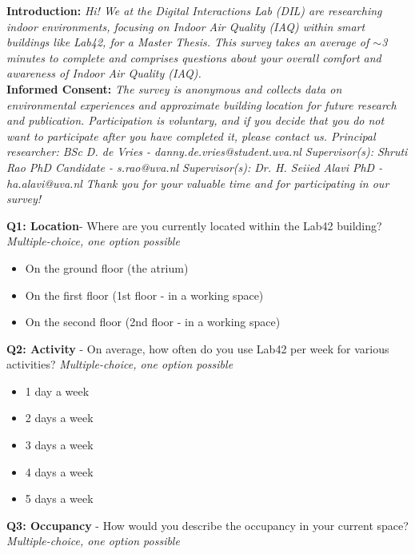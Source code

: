 \begin{appendices}
\vspace{10pt} 

\textbf{Introduction:}
\textit{Hi! We at the Digital Interactions Lab (DIL) are researching indoor environments, focusing on Indoor Air Quality (IAQ) within smart buildings like Lab42, for a Master Thesis. This survey takes an average of $\sim$3 minutes to complete and comprises questions about your overall comfort and awareness of Indoor Air Quality (IAQ).}\\

\textbf{Informed Consent:}
\textit{The survey is anonymous and collects data on environmental experiences and approximate building location for future research and publication. Participation is voluntary, and if you decide that you do not want to participate after you have completed it, please contact us. Principal researcher: BSc D. de Vries - danny.de.vries@student.uva.nl Supervisor(s): Shruti Rao PhD Candidate - s.rao@uva.nl Supervisor(s): Dr. H. Seiied Alavi PhD - ha.alavi@uva.nl Thank you for your valuable time and for participating in our survey!}

\vspace{10pt} 

\textbf{Q1: Location}- Where are you currently located within the Lab42 building? \textit{Multiple-choice, one option possible}

\begin{itemize}
    \item On the ground floor (the atrium)
    \item On the first floor (1st floor - in a working space)
    \item On the second floor (2nd floor - in a working space)
\end{itemize}

\textbf{Q2: Activity} - On average, how often do you use Lab42 per week for various activities? \textit{Multiple-choice, one option possible}

\begin{itemize}
    \item 1 day a week
    \item 2 days a week
    \item 3 days a week
    \item 4 days a week
    \item 5 days a week
\end{itemize}

\textbf{Q3: Occupancy} - How would you describe the occupancy in your current space? \textit{Multiple-choice, one option possible}


\end{appendices}
